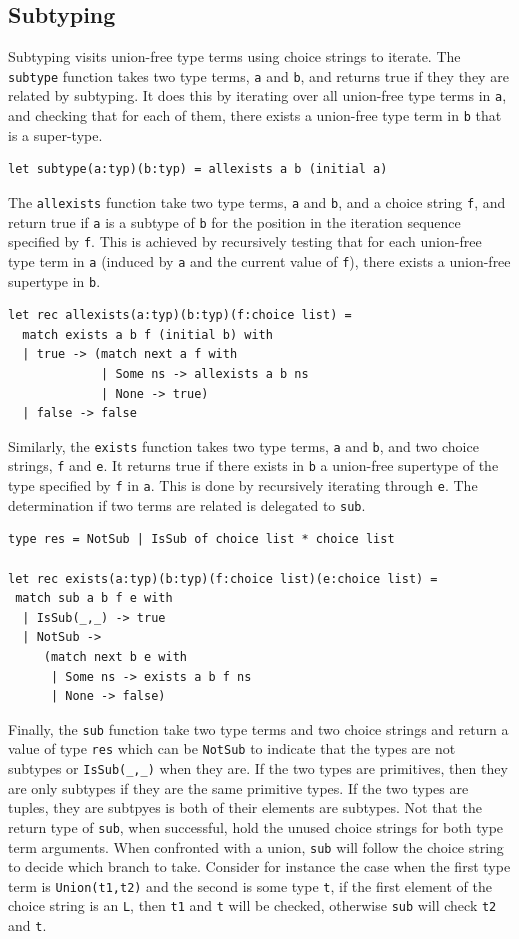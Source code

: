 \documentclass[a4paper,english]{lipics-v2019}
\renewcommand{\L}{{\tt L}\xspace}
\renewcommand{\c}[1]{\lstinline{#1}\xspace}
\begin{document}
\subsection{Subtyping}

Subtyping visits union-free type terms using choice strings to iterate.  The
\c{subtype} function takes two type terms, \c a and \c b, and returns true
if they they are related by subtyping. It does this by iterating over all
union-free type terms in \c a, and checking that for each of them, there
exists a union-free type term in \c b that is a super-type.

\begin{lstlisting}
let subtype(a:typ)(b:typ) = allexists a b (initial a)
\end{lstlisting}

The \c{allexists} function take two type terms, \c a and \c b, and a choice
string \c f, and return true if \c a is a subtype of \c b for the position
in the iteration sequence specified by \c f. This is achieved by recursively
testing that for each union-free type term in \c a (induced by \c a and the
current value of \c f), there exists a union-free supertype in \c b.

\begin{lstlisting}
let rec allexists(a:typ)(b:typ)(f:choice list) =
  match exists a b f (initial b) with 
  | true -> (match next a f with
             | Some ns -> allexists a b ns 
             | None -> true) 
  | false -> false
\end{lstlisting}

Similarly, the \c{exists} function takes two type terms, \c a and \c b, and
two choice strings, \c f and \c e. It returns true if there exists in \c b a
union-free supertype of the type specified by \c f in \c a. This is done by
recursively iterating through \c e. The determination if two terms are
related is delegated to \c{sub}.

\begin{lstlisting}
type res = NotSub | IsSub of choice list * choice list

let rec exists(a:typ)(b:typ)(f:choice list)(e:choice list) =
 match sub a b f e with 
  | IsSub(_,_) -> true 
  | NotSub -> 
     (match next b e with
      | Some ns -> exists a b f ns 
      | None -> false) 
\end{lstlisting}

Finally, the \c{sub} function take two type terms and two choice strings and
return a value of type \c{res} which can be \c{NotSub} to indicate that the
types are not subtypes or \c{IsSub(_,_)} when they are.  If the two types
are primitives, then they are only subtypes if they are the same primitive
types.  If the two types are tuples, they are subtpyes is both of their
elements are subtypes. Not that the return type of \c{sub}, when successful,
hold the unused choice strings for both type term arguments. When confronted
with a union, \c{sub} will follow the choice string to decide which branch
to take. Consider for instance the case when the first type term is
\c{Union(t1,t2)} and the second is some type \c{t}, if the first element of
the choice string is an \L, then \c{t1} and \c{t} will be checked, otherwise
\c{sub} will check \c{t2} and \c{t}.
\end{document}
